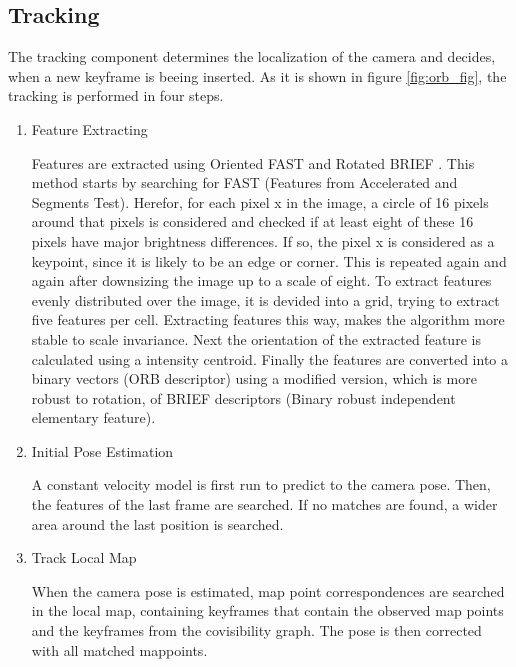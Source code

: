 	
	\subsection{Tracking}
	
	The tracking component determines the localization of the camera and decides, when a new keyframe is beeing inserted.
	As it is shown in figure \ref{fig:orb_fig}, the tracking is performed in four steps.
	
	\begin{enumerate}
	\item Feature Extracting 
	
	Features are extracted using Oriented FAST and Rotated BRIEF \cite{orb_feat}. This method starts by searching for 
	FAST (Features from Accelerated and Segments Test). Herefor, for each pixel x in the image, a circle of 16 pixels around that pixels
	is considered and checked if at least eight of these 16 pixels have major brightness differences. If so, the pixel x is considered as 
	a keypoint, since it is likely to be an edge or corner. This is repeated again and again after downsizing the image up to a scale of eight. 
	To extract features evenly distributed over the image, it is devided into a grid, trying to extract five features per cell. 
	Extracting features this way, makes the algorithm more stable to scale invariance. 
	Next the orientation of the extracted feature is calculated using a intensity centroid. 
	Finally the features are converted into a binary vectors (ORB descriptor) using a modified version, which is more robust to rotation, of BRIEF descriptors (Binary robust independent elementary feature).
	
	
	
	\item Initial Pose Estimation
	
	A constant velocity model is first run to predict to the camera pose. Then, the features of the last frame are searched. If no matches are found, 
	a wider area around the last position is searched. 
	
	\item Track Local Map 
	
	When the camera pose is estimated, map point correspondences are searched in 
	the local map, containing keyframes that contain the observed map points and
	the keyframes from the covisibility graph. The pose is then corrected with all
	matched mappoints. 
	

\end{enumerate}
